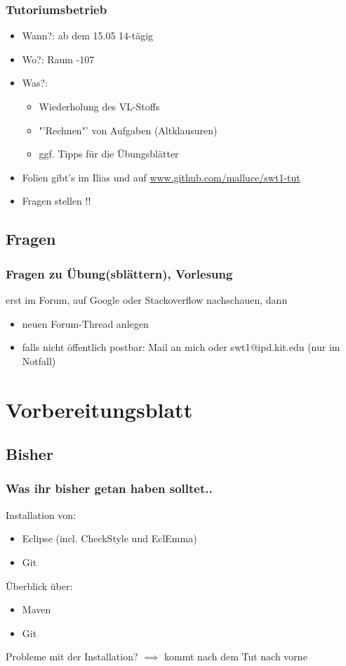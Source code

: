 \documentclass[18pt]{beamer}
\begin{document}
		\begin{frame}
			\frametitle{Tutoriumsbetrieb}
			\begin{itemize}
				\item Wann?: ab dem 15.05 14-tägig 
				\item Wo?: Raum -107
				\item Was?: 
					\begin{itemize}
						\item Wiederholung des VL-Stoffs
						\item "'Rechnen"' von Aufgaben (Altklausuren)
						\item ggf. Tipps für die Übungsblätter
					\end{itemize}
				\item Folien gibt's im Ilias und auf \url{www.github.com/malluce/swt1-tut}
				\item Fragen stellen !!
			\end{itemize}
		\end{frame}
		
	\subsection{Fragen}
		\begin{frame}
			\frametitle{Fragen zu Übung(sblättern), Vorlesung}
			erst im Forum, auf Google oder Stackoverflow nachschauen, dann
				\begin{itemize}
					\item neuen Forum-Thread anlegen
					\item falls nicht öffentlich postbar: Mail an mich oder swt1@ipd.kit.edu (nur im Notfall)
				\end{itemize}
		\end{frame}
		
\section{Vorbereitungsblatt}
	\subsection{Bisher}
	\begin{frame}
		\frametitle{Was ihr bisher getan haben solltet..}
		Installation von:
		\begin{itemize}
			\item Eclipse (incl. CheckStyle und EclEmma)
			\item Git
		\end{itemize}
		Überblick über:
		\begin{itemize}
			\item Maven
			\item Git
		\end{itemize}
		Probleme mit der Installation? $\implies$ kommt nach dem Tut nach vorne
	\end{frame}
		
\end{document}
